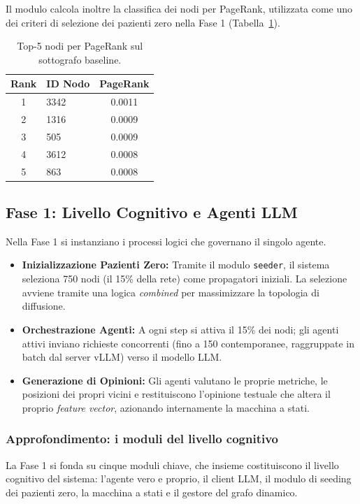 \documentclass[11pt, a4paper]{article}
\begin{document}
Il modulo calcola inoltre la classifica dei nodi per PageRank, utilizzata come uno dei criteri di selezione dei pazienti zero nella Fase 1 (Tabella~\ref{tab:top5-pagerank}).

\begin{table}[h]
    \centering
    \small
    \begin{tabular}{clc}
        \toprule
        \textbf{Rank} & \textbf{ID Nodo} & \textbf{PageRank} \\
        \midrule
        1 & 3342 & 0.0011 \\
        2 & 1316 & 0.0009 \\
        3 & 505  & 0.0009 \\
        4 & 3612 & 0.0008 \\
        5 & 863  & 0.0008 \\
        \bottomrule
    \end{tabular}
    \caption{Top-5 nodi per PageRank sul sottografo baseline.}
    \label{tab:top5-pagerank}
\end{table}

\subsection{Fase 1: Livello Cognitivo e Agenti LLM}
Nella Fase 1 si instanziano i processi logici che governano il singolo agente.
\begin{itemize}[leftmargin=*]
    \item \textbf{Inizializzazione Pazienti Zero:} Tramite il modulo \texttt{seeder}, il sistema seleziona 750 nodi (il 15\% della rete) come propagatori iniziali. La selezione avviene tramite una logica \textit{combined} per massimizzare la topologia di diffusione.
    \item \textbf{Orchestrazione Agenti:} A ogni step si attiva il 15\% dei nodi; gli agenti attivi inviano richieste concorrenti (fino a 150 contemporanee, raggruppate in batch dal server vLLM) verso il modello LLM.
    \item \textbf{Generazione di Opinioni:} Gli agenti valutano le proprie metriche, le posizioni dei propri vicini e restituiscono l'opinione testuale che altera il proprio \textit{feature vector}, azionando internamente la macchina a stati.
\end{itemize}

\subsubsection{Approfondimento: i moduli del livello cognitivo}
La Fase 1 si fonda su cinque moduli chiave, che insieme costituiscono il livello cognitivo del sistema: l'agente vero e proprio, il client LLM, il modulo di seeding dei pazienti zero, la macchina a stati e il gestore del grafo dinamico.
\end{document}
